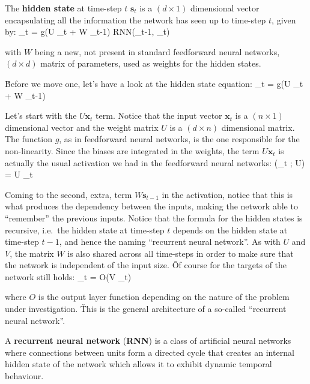 The \textbf{hidden state} at time-step $t$ $\boldsymbol{s}_{t}$ is a $(d \times 1)$ dimensional vector encapsulating
all the information the network has seen up to time-step $t$, given by:
\bse
{}_{t} = g(U _{t} + W _{t-1}) \coloneqq RNN(_{t-1},
_{t})
\ese

with $W$ being a new, not present in standard feedforward neural networks, $(d \times d)$ matrix of parameters, used as
weights for the hidden states.
\ed


\v

Before we move one, let's have a look at the hidden state equation:
\bse
{}_{t} = g(U _{t} + W _{t-1})
\ese

Let's start with the $U \boldsymbol{x}_{t}$ term. Notice that the input vector $\boldsymbol{x}_{t}$ is a $(n \times 1
)$ dimensional vector and the weight matrix $U$ is a $(d\times n)$ dimensional matrix. The function $g$, as in
feedforward neural networks, is the one responsible for the non-linearity. Since the biases are integrated in the
weights, the term $U \boldsymbol{x}_{t}$ is actually the usual activation we had in the feedforward neural networks:
\bse
{}(_{t} ; U) = U _{t}
\ese

Coming to the second, extra, term $W \boldsymbol{s}_{t-1}$ in the activation, notice that this is what produces the
dependency between the inputs, making the network able to ``remember'' the previous inputs. Notice that the formula
for the hidden states is recursive, i.e.\ the hidden state at time-step $t$ depends on the hidden state at time-step
$t-1$, and hence the naming ``recurrent neural network''. As with $U$ and $V$, the matrix $W$ is also shared across all
time-steps in order to make sure that the network is independent of the input size. \v

Of course for the targets of the network still holds:
\bse
{}_t = O(V _{t})
\ese

where $O$ is the output layer function depending on the nature of the problem under investigation. \v

This is the general architecture of a so-called ``recurrent neural network''.

A \textbf{recurrent neural network} (\textbf{RNN}) is a class of artificial neural networks where connections between
units form a directed cycle that creates an internal hidden state of the network which allows it to exhibit dynamic temporal
behaviour.
\ed

